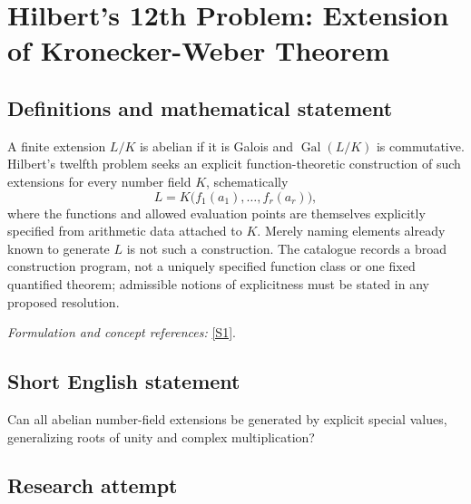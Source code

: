 \documentclass[11pt,a4paper]{article}
\newcommand{\sref}[2]{\hyperlink{source:#1:#2}{[S#2]}}
\newif\ifshowcatalogue
\newcommand{\cataloguescope}[1]{\ifshowcatalogue
 \paragraph{Exact scope in the supplied catalogue.}
 \begin{quote}\small #1\end{quote}\fi}
\numberwithin{equation}{section}
\begin{document}
\setcounter{section}{0}
\clearpage
\section*{\texorpdfstring{Hilbert's 12th Problem: Extension of Kronecker-Weber Theorem}{Hilbert's 12th Problem: Extension of Kronecker-Weber Theorem}}\label{45}
\subsection{Definitions and mathematical statement}
A finite extension $L/K$ is abelian if it is Galois and $\operatorname{Gal}(L/K)$ is commutative. Hilbert's twelfth problem seeks an explicit function-theoretic construction of such extensions for every number field $K$, schematically
\[
 L=K\bigl(f_1(a_1),\ldots,f_r(a_r)\bigr),
\]
where the functions and allowed evaluation points are themselves explicitly specified from arithmetic data attached to $K$. Merely naming elements already known to generate $L$ is not such a construction. The catalogue records a broad construction program, not a uniquely specified function class or one fixed quantified theorem; admissible notions of explicitness must be stated in any proposed resolution.
\par\smallskip\textit{Formulation and concept references:} \sref{45}{1}.
\cataloguescope{For each number field K, construct generators for its finite abelian extensions as special values of explicitly defined analytic or arithmetic functions associated with K, extending roots of unity over Q and complex multiplication over imaginary quadratic fields.}
\subsection{Short English statement}
Can all abelian number-field extensions be generated by explicit special values, generalizing roots of unity and complex multiplication?
\subsection{Research attempt}
\end{document}
